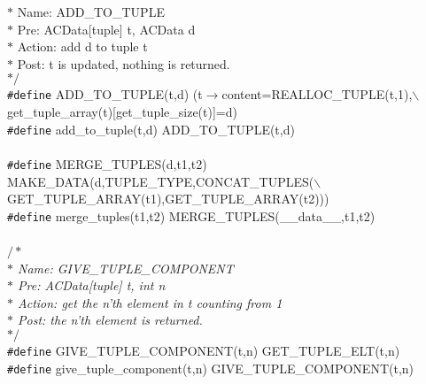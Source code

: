 \begin{flushleft}
{\hspace*{1\indentation}$\ast$ Name: ADD\_TO\_TUPLE\mbox{}\\
\hspace*{1\indentation}$\ast$ Pre: ACData[tuple] t, ACData d\mbox{}\\
\hspace*{1\indentation}$\ast$ Action: add d to tuple t\mbox{}\\
\hspace*{1\indentation}$\ast$ Post: t is updated, nothing is returned.\mbox{}\\
\hspace*{1\indentation}$\ast/$}\mbox{}\\
{\tt \#define} ADD\_TO\_TUPLE(t,d) (t$\rightarrow$content=REALLOC\_TUPLE(t,1),$\backslash$\\
\hspace*{26\indentation}get\_tuple\_array(t)[get\_tuple\_size(t)]=d)\mbox{}\\
{\tt \#define} add\_to\_tuple(t,d) ADD\_TO\_TUPLE(t,d)\mbox{}\\
\mbox{}\\
{\tt \#define} MERGE\_TUPLES(d,t1,t2) MAKE\_DATA(d,TUPLE\_TYPE,CONCAT\_TUPLES($\backslash$\\
\hspace*{30\indentation}GET\_TUPLE\_ARRAY(t1),GET\_TUPLE\_ARRAY(t2)))\mbox{}\\
{\tt \#define} merge\_tuples(t1,t2) MERGE\_TUPLES(\_\_data\_\_,t1,t2)\mbox{}\\
\mbox{}\\
{$/\ast$\it{}\mbox{}\\
\hspace*{1\indentation}$\ast$ Name: GIVE\_TUPLE\_COMPONENT\mbox{}\\
\hspace*{1\indentation}$\ast$ Pre: ACData[tuple] t, int n\mbox{}\\
\hspace*{1\indentation}$\ast$ Action: get the n'th element in t counting from 1\mbox{}\\
\hspace*{1\indentation}$\ast$ Post: the n'th element is returned.\mbox{}\\
\hspace*{1\indentation}$\ast/$}\mbox{}\\
{\tt \#define} GIVE\_TUPLE\_COMPONENT(t,n) GET\_TUPLE\_ELT(t,n)\mbox{}\\
{\tt \#define} give\_tuple\_component(t,n) GIVE\_TUPLE\_COMPONENT(t,n)\mbox{}\\

\end{flushleft}
